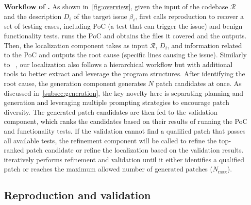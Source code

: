 \textbf{Workflow of \sys.}
As shown in~\cref{fig:overview}, given the input of the codebase $\mathcal{R}$ and the description $D_i$ of the target issue $\beta_i$, \sys first calls reproduction to recover a set of testing cases, including PoC (a test that can trigger the issue) and benign functionality tests.
\sys runs the PoC and obtains the files it covered and the outputs. 
Then, the localization component takes as input $\mathcal{R}$, $D_i$, and information related to the PoC and outputs the root cause (specific lines causing the issue).
Similarly to \agentless{}~\cite{xia2024agentless}, our localization also follows a hierarchical workflow but with additional tools to better extract and leverage the program structures. 
After identifying the root cause, the generation component generates $N$ patch candidates at once.
As discussed in~\cref{subsec:generation}, the key novelty here is separating planning and generation and leveraging multiple prompting strategies to encourage patch diversity. 
The generated patch candidates are then fed to the validation component, which ranks the candidates based on their results of running the PoC and functionality tests.
If the validation cannot find a qualified patch that passes all available tests, the refinement component will be called to refine the top-ranked patch candidate or refine the localization based on the validation results.
\sys iteratively performs refinement and validation until it either identifies a qualified patch or reaches the maximum allowed number of generated patches ($N_{\text{max}}$).



\subsection{Reproduction and validation}
\label{subsec:reproduce}

